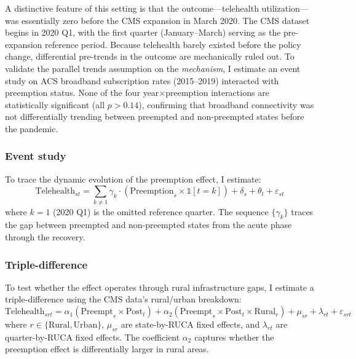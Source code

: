 \documentclass[12pt]{article}
\begin{document}
A distinctive feature of this setting is that the outcome---telehealth utilization---was essentially zero before the CMS expansion in March 2020. The CMS dataset begins in 2020 Q1, with the first quarter (January--March) serving as the pre-expansion reference period. Because telehealth barely existed before the policy change, differential pre-trends in the outcome are mechanically ruled out. To validate the parallel trends assumption on the \textit{mechanism}, I estimate an event study on ACS broadband subscription rates (2015--2019) interacted with preemption status. None of the four year$\times$preemption interactions are statistically significant (all $p > 0.14$), confirming that broadband connectivity was not differentially trending between preempted and non-preempted states before the pandemic.

\subsubsection*{Event study} To trace the dynamic evolution of the preemption effect, I estimate:
\begin{equation}
    \text{Telehealth}_{st} = \sum_{k \neq 1} \gamma_k \cdot (\text{Preemption}_s \times \mathbb{1}[t = k]) + \delta_s + \theta_t + \varepsilon_{st}
    \label{eq:event}
\end{equation}
where $k = 1$ (2020 Q1) is the omitted reference quarter. The sequence $\{\gamma_k\}$ traces the gap between preempted and non-preempted states from the acute phase through the recovery.

\subsubsection*{Triple-difference} To test whether the effect operates through rural infrastructure gaps, I estimate a triple-difference using the CMS data's rural/urban breakdown:
\begin{equation}
    \text{Telehealth}_{srt} = \alpha_1 (\text{Preempt}_s \times \text{Post}_t) + \alpha_2 (\text{Preempt}_s \times \text{Post}_t \times \text{Rural}_r) + \mu_{sr} + \lambda_{rt} + \varepsilon_{srt}
\end{equation}
where $r \in \{\text{Rural}, \text{Urban}\}$, $\mu_{sr}$ are state-by-RUCA fixed effects, and $\lambda_{rt}$ are quarter-by-RUCA fixed effects. The coefficient $\alpha_2$ captures whether the preemption effect is differentially larger in rural areas.
\end{document}
